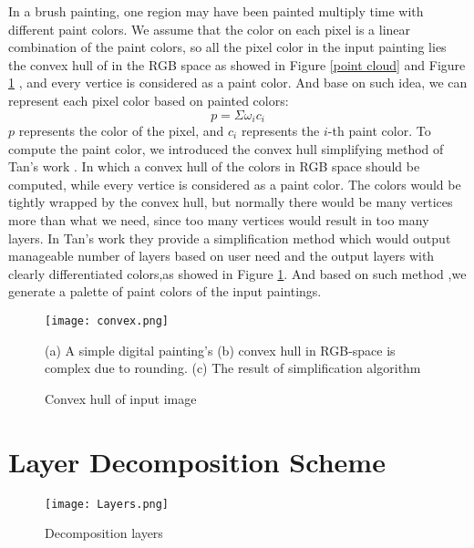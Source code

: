 In a brush painting, one region may have been painted multiply time with different paint colors. We assume that the color on each pixel is a linear combination of the paint colors, so all the pixel color in the input painting lies the convex hull of in the RGB space as showed in Figure \ref{point cloud} and Figure \ref{convex} , and every vertice is considered as a paint color. And base on such idea, we can represent each pixel color based on painted colors: 
\begin{equation*}
p=\Sigma \omega_i c_i
\end{equation*}
$p$ represents the color of the pixel, and $c_i$ represents the $i$-th paint color. 
To compute the paint color, we introduced the convex hull simplifying method of Tan's work \cite{tan2016decomposing}. In which a convex hull of the colors in RGB space should be computed, while every vertice is considered as a paint color. The colors would be tightly wrapped by the convex hull, but normally there would be many vertices more than what we need, since too many vertices would result in too many layers. In Tan's work \cite{tan2016decomposing} they provide a simplification method which would output manageable number of layers based on user need and the output layers with clearly differentiated colors,as showed in Figure \ref{convex}. And based on such method ,we generate a palette of paint colors of the input paintings. 

\begin{figure}[H]
	\centering
	\texttt{[image: convex.png]}
	\caption{Convex hull of input image}
	\label{convex}
	\medskip
	\small
	(a) A simple digital painting’s (b) convex hull in RGB-space is complex due to rounding. (c) The result of simplification algorithm 
\end{figure}

\section{Layer Decomposition Scheme}

\begin{figure}[H]
	\centering
	\texttt{[image: Layers.png]}
	\caption{Decomposition layers }
	\label{decom:4layers}
\end{figure}


